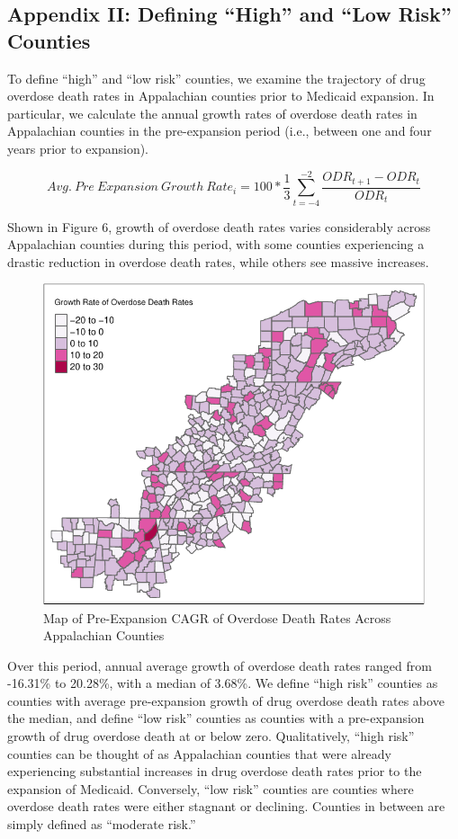 \documentclass[
  11pt,
]{article}
\begin{document}
\newpage

\hypertarget{appendix-ii-defining-high-and-low-risk-counties}{%
\subsection{Appendix II: Defining ``High'' and ``Low Risk''
Counties}\label{appendix-ii-defining-high-and-low-risk-counties}}

To define ``high'' and ``low risk'' counties, we examine the trajectory
of drug overdose death rates in Appalachian counties prior to Medicaid
expansion. In particular, we calculate the annual growth rates of
overdose death rates in Appalachian counties in the pre-expansion period
(i.e., between one and four years prior to expansion).

\[Avg.~Pre~Expansion~Growth~Rate_{i} = 100 * \frac{1}{3} \sum_{t=-4}^{-2} \frac{ODR_{t+1} - ODR_t}{ODR_t}\]

Shown in Figure 6, growth of overdose death rates varies considerably
across Appalachian counties during this period, with some counties
experiencing a drastic reduction in overdose death rates, while others
see massive increases.

\begin{figure}
\centering
\includegraphics{figs/fig6.pdf}
\caption{Map of Pre-Expansion CAGR of Overdose Death Rates Across
Appalachian Counties}
\end{figure}

Over this period, annual average growth of overdose death rates ranged
from -16.31\% to 20.28\%, with a median of 3.68\%. We define ``high
risk'' counties as counties with average pre-expansion growth of drug
overdose death rates above the median, and define ``low risk'' counties
as counties with a pre-expansion growth of drug overdose death at or
below zero. Qualitatively, ``high risk'' counties can be thought of as
Appalachian counties that were already experiencing substantial
increases in drug overdose death rates prior to the expansion of
Medicaid. Conversely, ``low risk'' counties are counties where overdose
death rates were either stagnant or declining. Counties in between are
simply defined as ``moderate risk.''
\end{document}
